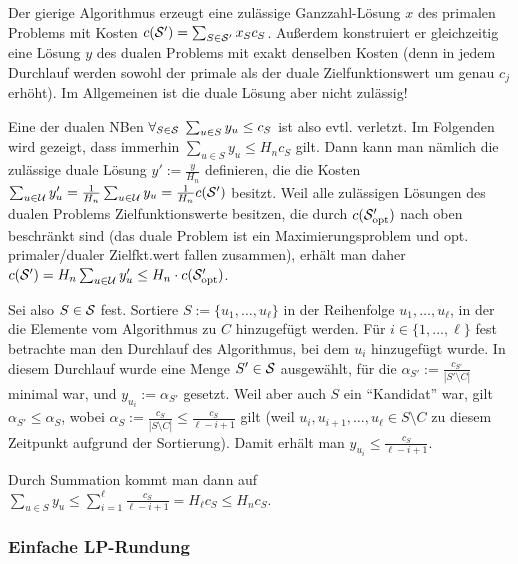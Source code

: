 \begin{Beweis}
    Der gierige Algorithmus erzeugt eine zulässige Ganzzahl-Lösung $x$ des primalen Problems
    mit Kosten $c(\S') = \sum_{S \in \S'} x_S c_S$.
    Außerdem konstruiert er gleichzeitig eine Lösung $y$ des dualen Problems mit
    exakt denselben Kosten
    (denn in jedem Durchlauf werden sowohl der primale als der duale Zielfunktionswert um
    genau $c_j$ erhöht).
    Im Allgemeinen ist die duale Lösung aber nicht zulässig!
    
    Eine der dualen NBen $\forall_{S \in \S}\; \sum_{u \in S} y_u \le c_S$
    ist also evtl. verletzt.
    Im Folgenden wird gezeigt, dass immerhin $\sum_{u \in S} y_u \le H_n c_S$ gilt.
    Dann kann man nämlich die zulässige duale Lösung $y' := \frac{y}{H_n}$ definieren,
    die die Kosten $\sum_{u \in \U} y_u' = \frac{1}{H_n} \sum_{u \in \U} y_u =
    \frac{1}{H_n} c(\S')$ besitzt.
    Weil alle zulässigen Lösungen des dualen Problems Zielfunktionswerte besitzen,
    die durch $c(\S_\opt')$ nach oben beschränkt sind
    (das duale Problem ist ein Maximierungsproblem und
    opt. primaler/dualer Zielfkt.wert fallen zusammen),
    erhält man daher
    $c(\S') = H_n \sum_{u \in \U} y_u' \le H_n \cdot c(\S_\opt')$.
    
    Sei also $S \in \S$ fest.
    Sortiere $S := \{u_1, \dotsc, u_\ell\}$ in der Reihenfolge $u_1, \dotsc, u_\ell$,
    in der die Elemente vom Algorithmus zu $C$ hinzugefügt werden.
    Für $i \in \{1, \dotsc, \ell\}$ fest betrachte man den Durchlauf des Algorithmus, bei dem
    $u_i$ hinzugefügt wurde.
    In diesem Durchlauf wurde eine Menge $S' \in \S$ ausgewählt, für die
    $\alpha_{S'} := \frac{c_{S'}}{|S' \setminus C|}$ minimal war, und $y_{u_i} := \alpha_{S'}$
    gesetzt.
    Weil aber auch $S$ ein "`Kandidat"' war, gilt $\alpha_{S'} \le \alpha_S$,
    wobei $\alpha_S := \frac{c_S}{|S \setminus C|} \le \frac{c_S}{\ell - i + 1}$ gilt
    (weil $u_i, u_{i+1}, \dotsc, u_\ell \in S \setminus C$ zu diesem Zeitpunkt aufgrund der
    Sortierung).
    Damit erhält man $y_{u_i} \le \frac{c_S}{\ell - i + 1}$.
    
    Durch Summation kommt man dann auf
    $\sum_{u \in S} y_u \le
    \sum_{i=1}^\ell \frac{c_S}{\ell - i + 1} = H_\ell c_S \le H_n c_S$.
\end{Beweis}

\pagebreak

\subsubsection{%
    Einfache LP-Rundung%
}


